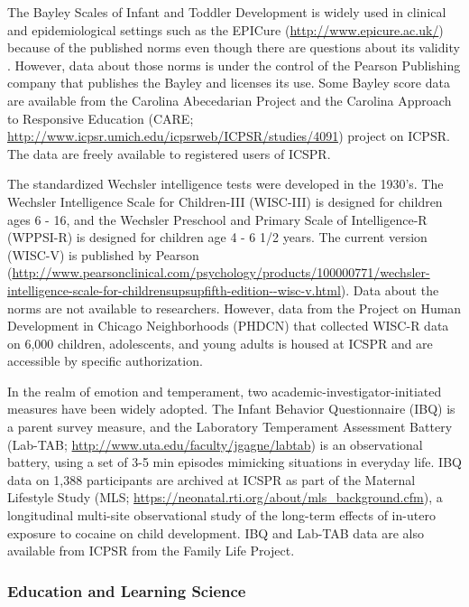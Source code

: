 \documentclass[letterpaper,man,apacite,natbib]{apa6}
\begin{document}
The Bayley Scales of Infant and Toddler Development \cite{bayley2006bayley} is widely used in clinical and epidemiological settings such as the EPICure (\url{http://www.epicure.ac.uk/}) because of the published norms even though there are questions about its validity \cite{hack_poor_2005}.
However, data about those norms is under the control of the Pearson Publishing company that publishes the Bayley and licenses its use.
Some Bayley score data are available from the Carolina Abecedarian Project and the Carolina Approach to Responsive Education (CARE; \url{http://www.icpsr.umich.edu/icpsrweb/ICPSR/studies/4091}) project on ICPSR.
The data are freely available to registered users of ICSPR. 

The standardized Wechsler intelligence tests were developed in the 1930's. 
The Wechsler Intelligence Scale for Children-III (WISC-III) is designed for children ages 6 - 16, and the Wechsler Preschool and Primary Scale of Intelligence-R (WPPSI-R) is designed for children age 4 - 6 1/2 years.
The current version (WISC-V) is published by Pearson (\url{http://www.pearsonclinical.com/psychology/products/100000771/wechsler-intelligence-scale-for-childrensupsupfifth-edition--wisc-v.html}).
Data about the norms are not available to researchers.
However, data from the Project on Human Development in Chicago Neighborhoods (PHDCN) that collected WISC-R data on 6,000 children, adolescents, and young adults is housed at ICSPR and are accessible by specific authorization.

In the realm of emotion and temperament, two academic-investigator-initiated measures have been widely adopted.
The Infant Behavior Questionnaire (IBQ) is a parent survey measure, and the Laboratory Temperament Assessment Battery (Lab-TAB; \url{http://www.uta.edu/faculty/jgagne/labtab}) is an observational battery, using a set of 3-5 min episodes mimicking situations in everyday life.
IBQ data on 1,388 participants are archived at ICSPR as part of the Maternal Lifestyle Study (MLS; \url{https://neonatal.rti.org/about/mls_background.cfm}), a longitudinal multi-site observational study of the long-term effects of in-utero exposure to cocaine on child development.
IBQ and Lab-TAB data are also available from ICPSR from the Family Life Project.

\subsubsection{Education and Learning Science}
\end{document}
